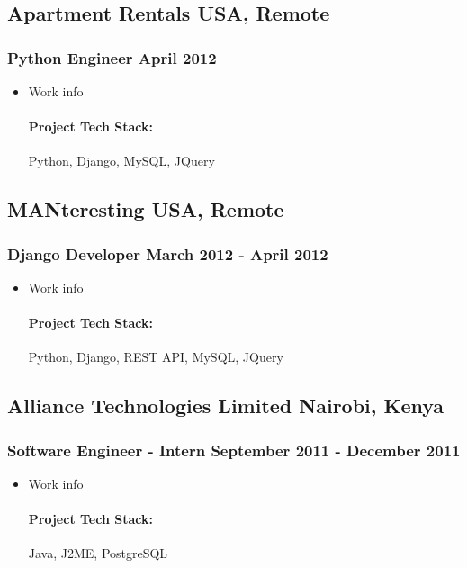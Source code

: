 \documentclass[11pt]{article} %
\begin{document}
\subsection{Apartment Rentals \hfill USA, Remote}
\subsubsection{Python Engineer \hfill  April 2012}
\begin{itemize}
    \item Work info
    \paragraph{Project Tech Stack:} Python, Django, MySQL, JQuery
\end{itemize}

\subsection{MANteresting \hfill USA, Remote}
\subsubsection{Django Developer \hfill  March 2012 - April 2012}
\begin{itemize}
    \item Work info
    \paragraph{Project Tech Stack:} Python, Django, REST API, MySQL, JQuery
\end{itemize}

\subsection{Alliance Technologies Limited \hfill Nairobi, Kenya}
\subsubsection{Software Engineer - Intern \hfill  September 2011 - December 2011}
\begin{itemize}
    \item Work info
    \paragraph{Project Tech Stack:} Java, J2ME, PostgreSQL
\end{itemize}
\end{document}
